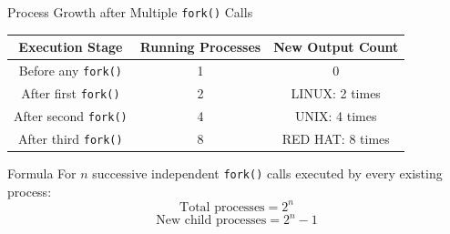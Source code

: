\documentclass[aspectratio=169]{beamer}
\begin{document}
\begin{frame}{Process Growth after Multiple \texttt{fork()} Calls}

\begin{center}
\begin{tabular}{|c|c|c|}
\hline
\textbf{Execution Stage} &
\textbf{Running Processes} &
\textbf{New Output Count} \\
\hline
Before any \texttt{fork()} & 1 & 0 \\
\hline
After first \texttt{fork()} & 2 & LINUX: 2 times \\
\hline
After second \texttt{fork()} & 4 & UNIX: 4 times \\
\hline
After third \texttt{fork()} & 8 & RED HAT: 8 times \\
\hline
\end{tabular}
\end{center}

\vspace{0.4cm}

\begin{block}{Formula}
For \(n\) successive independent \texttt{fork()} calls executed by every existing
process:
\[
\text{Total processes}=2^n
\]
\[
\text{New child processes}=2^n-1
\]
\end{block}

\end{frame}
\end{document}
